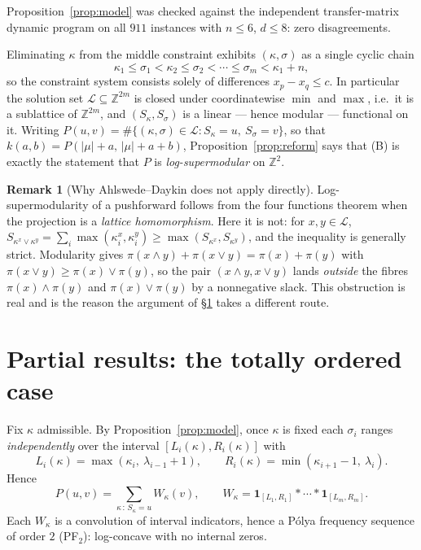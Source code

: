 \documentclass[11pt]{article}
\theoremstyle{plain}
\theoremstyle{definition}
\newtheorem{remark}[theorem]{Remark}
\newcommand{\ZZ}{\mathbb{Z}}
\begin{document}
Proposition~\ref{prop:model} was checked against the independent transfer-matrix dynamic program on
all $911$ instances with $n\le6$, $d\le8$: zero disagreements.

Eliminating $\kappa$ from the middle constraint exhibits $(\kappa,\sigma)$ as a single cyclic chain
\[
\kappa_1\le\sigma_1<\kappa_2\le\sigma_2<\cdots\le\sigma_m<\kappa_1+n ,
\]
so the constraint system consists solely of differences $x_p-x_q\le c$. In particular the solution
set $\mathcal{L}\subseteq\ZZ^{2m}$ is closed under coordinatewise $\min$ and $\max$, i.e.\ it is a
sublattice of $\ZZ^{2m}$, and $(S_\kappa,S_\sigma)$ is a linear --- hence modular --- functional on
it. Writing $P(u,v)=\#\{(\kappa,\sigma)\in\mathcal{L}:S_\kappa=u,\ S_\sigma=v\}$, so that
$k(a,b)=P(|\mu|+a,\,|\mu|+a+b)$, Proposition~\ref{prop:reform} says that (B) is exactly the
statement that $P$ is \emph{log-supermodular} on $\ZZ^2$.

\begin{remark}[Why Ahlswede--Daykin does not apply directly]
Log-supermodularity of a pushforward follows from the four functions theorem when the projection is
a \emph{lattice homomorphism}. Here it is not: for $x,y\in\mathcal{L}$,
$S_{\kappa^x\vee\kappa^y}=\sum_i\max(\kappa^x_i,\kappa^y_i)\ge\max(S_{\kappa^x},S_{\kappa^y})$, and
the inequality is generally strict. Modularity gives
$\pi(x\wedge y)+\pi(x\vee y)=\pi(x)+\pi(y)$ with $\pi(x\vee y)\ge\pi(x)\vee\pi(y)$, so the pair
$(x\wedge y,x\vee y)$ lands \emph{outside} the fibres $\pi(x)\wedge\pi(y)$ and $\pi(x)\vee\pi(y)$ by
a nonnegative slack. This obstruction is real and is the reason the argument of \S\ref{sec:partial}
takes a different route.
\end{remark}

\section{Partial results: the totally ordered case}\label{sec:partial}

Fix $\kappa$ admissible. By Proposition~\ref{prop:model}, once $\kappa$ is fixed each $\sigma_i$
ranges \emph{independently} over the interval $[L_i(\kappa),R_i(\kappa)]$ with
\[
L_i(\kappa)=\max(\kappa_i,\ \lambda_{i-1}+1),\qquad R_i(\kappa)=\min(\kappa_{i+1}-1,\ \lambda_i).
\]
Hence
\begin{equation}\label{eq:Wdef}
P(u,v)=\sum_{\kappa\,:\,S_\kappa=u}W_\kappa(v),\qquad
W_\kappa=\mathbf{1}_{[L_1,R_1]}*\cdots*\mathbf{1}_{[L_m,R_m]} .
\end{equation}
Each $W_\kappa$ is a convolution of interval indicators, hence a P\'olya frequency sequence of
order $2$ (PF$_2$): log-concave with no internal zeros.
\end{document}

